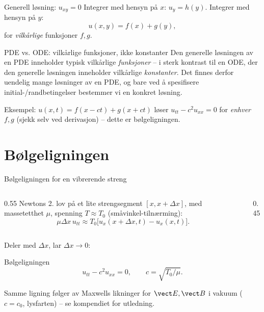 \documentclass[11pt,aspectratio=169]{beamer}
\begin{document}
\begin{frame}{Generell løsning: $u_{xy}=0$}
Integrer med hensyn på $x$: $u_y=h(y)$. Integrer med hensyn på $y$:
\begin{equation}
u(x,y) = f(x) + g(y),
\end{equation}
for \emph{vilkårlige} funksjoner $f,g$.
\begin{remb}{PDE vs. ODE: vilkårlige funksjoner, ikke konstanter}
Den generelle løsningen av en PDE inneholder typisk vilkårlige \emph{funksjoner} -- i sterk kontrast til en ODE, der den generelle løsningen inneholder vilkårlige \emph{konstanter}. Det finnes derfor uendelig mange løsninger av en PDE, og bare ved å spesifisere initial-/randbetingelser bestemmer vi en konkret løsning.
\end{remb}
Eksempel: $u(x,t)=f(x-ct)+g(x+ct)$ løser $u_{tt}-c^2u_{xx}=0$ for \emph{enhver} $f,g$ (sjekk selv ved derivasjon) -- dette er bølgeligningen.
\end{frame}

\section{Bølgeligningen}

\begin{frame}{Bølgeligningen for en vibrerende streng}
\begin{columns}
\begin{column}{0.55\textwidth}
Newtons 2. lov på et lite strengsegment $[x,x+\Delta x]$, med massetetthet $\mu$, spenning $T\approx T_0$ (småvinkel-tilnærming):
\[
\mu\Delta x\,u_{tt} \approx T_0\big[u_x(x+\Delta x,t)-u_x(x,t)\big].
\]
\end{column}
\begin{column}{0.45\textwidth}
\end{column}
\end{columns}
Deler med $\Delta x$, lar $\Delta x\to0$:
\begin{oppsumb}{Bølgeligningen}
\[
u_{tt} - c^2 u_{xx} = 0, \qquad c = \sqrt{T_0/\mu}.
\]
\end{oppsumb}
Samme ligning følger av Maxwells likninger for $\vect E,\vect B$ i vakuum ($c=c_0$, lysfarten) -- se kompendiet for utledning.
\end{frame}
\end{document}
